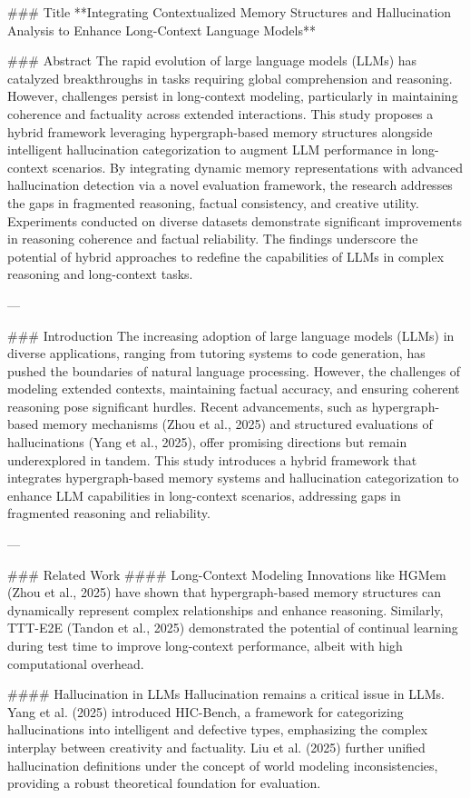 ### Title
**Integrating Contextualized Memory Structures and Hallucination Analysis to Enhance Long-Context Language Models**

### Abstract
The rapid evolution of large language models (LLMs) has catalyzed breakthroughs in tasks requiring global comprehension and reasoning. However, challenges persist in long-context modeling, particularly in maintaining coherence and factuality across extended interactions. This study proposes a hybrid framework leveraging hypergraph-based memory structures alongside intelligent hallucination categorization to augment LLM performance in long-context scenarios. By integrating dynamic memory representations with advanced hallucination detection via a novel evaluation framework, the research addresses the gaps in fragmented reasoning, factual consistency, and creative utility. Experiments conducted on diverse datasets demonstrate significant improvements in reasoning coherence and factual reliability. The findings underscore the potential of hybrid approaches to redefine the capabilities of LLMs in complex reasoning and long-context tasks.

---

### Introduction
The increasing adoption of large language models (LLMs) in diverse applications, ranging from tutoring systems to code generation, has pushed the boundaries of natural language processing. However, the challenges of modeling extended contexts, maintaining factual accuracy, and ensuring coherent reasoning pose significant hurdles. Recent advancements, such as hypergraph-based memory mechanisms (Zhou et al., 2025) and structured evaluations of hallucinations (Yang et al., 2025), offer promising directions but remain underexplored in tandem. This study introduces a hybrid framework that integrates hypergraph-based memory systems and hallucination categorization to enhance LLM capabilities in long-context scenarios, addressing gaps in fragmented reasoning and reliability.

---

### Related Work
#### Long-Context Modeling
Innovations like HGMem (Zhou et al., 2025) have shown that hypergraph-based memory structures can dynamically represent complex relationships and enhance reasoning. Similarly, TTT-E2E (Tandon et al., 2025) demonstrated the potential of continual learning during test time to improve long-context performance, albeit with high computational overhead.

#### Hallucination in LLMs
Hallucination remains a critical issue in LLMs. Yang et al. (2025) introduced HIC-Bench, a framework for categorizing hallucinations into intelligent and defective types, emphasizing the complex interplay between creativity and factuality. Liu et al. (2025) further unified hallucination definitions under the concept of world modeling inconsistencies, providing a robust theoretical foundation for evaluation.

